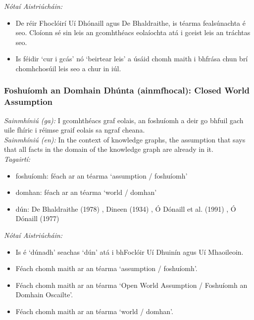  \noindent \textit{Nótaí Aistriúcháin:}
\begin{itemize}
	\item De réir Fhoclóirí Uí Dhónaill agus De Bhaldraithe, is téarma fealsúnachta é seo. Cloíonn sé sin leis an gcomhthéacs eolaíochta atá i gceist leis an tráchtas seo.
	\item Is féidir `cur i gcás' nó `beirtear leis' a úsáid chomh maith i bhfrása chun brí chomhchosúil leis seo a chur in iúl.
\end{itemize}


\subsubsection*{Foshuíomh an Domhain Dhúnta (ainmfhocal): Closed World Assumption}
 \noindent \textit{Sainmhíniú (ga):} I gcomhthéacs graf eolais, an foshuíomh a deir go bhfuil gach uile fhíric i réimse graif eolais sa ngraf cheana.
\\
 \noindent \textit{Sainmhíniú (en):} In the context of knowledge graphs, the assumption that says that all facts in the domain of the knowledge graph are already in it.
\\
 \noindent \textit{Tagairtí:}
\begin{itemize}
	\item foshuíomh: féach ar an téarma `assumption / foshuíomh'
	\item domhan: féach ar an téarma `world / domhan'
	\item dún: De Bhaldraithe (1978) \cite{de-bhaldraithe}, Dineen (1934) \cite{dineen}, Ó Dónaill et al. (1991) \cite{focloir-beag}, Ó Dónaill (1977) \cite{odonaill}
\end{itemize}

 \noindent \textit{Nótaí Aistriúcháin:}
\begin{itemize}
	\item Is é `dúnadh' seachas `dún' atá i bhFoclóir Uí Dhuinín agus Uí Mhaoileoin.
	\item Féach chomh maith ar an téarma `assumption / foshuíomh'.
	\item Féach chomh maith ar an téarma `Open World Assumption / Foshuíomh an Domhain Oscailte'.
	\item Féach chomh maith ar an téarma `world / domhan'.
\end{itemize}


